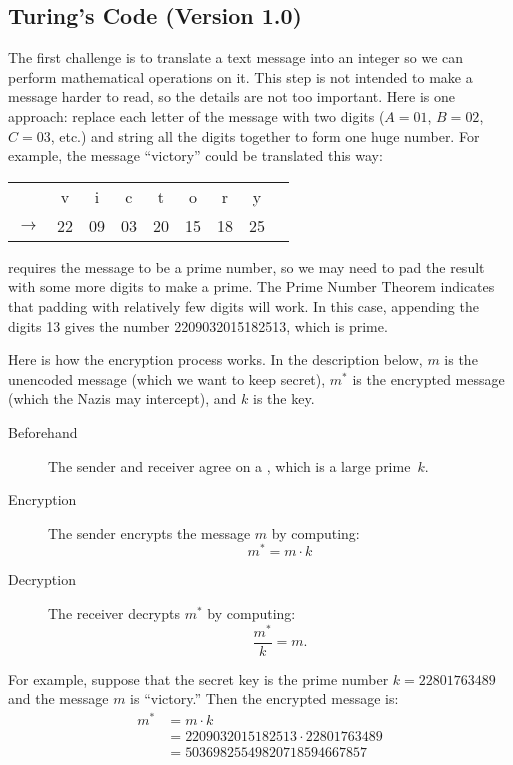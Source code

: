 \subsection{Turing's Code (Version 1.0)}

The first challenge is to translate a text message into an integer so
we can perform mathematical operations on it.  This step is not
intended to make a message harder to read, so the details are not too
important.  Here is one approach: replace each letter of the message
with two digits ($A = 01$, $B = 02$, $C = 03$, etc.) and string all
the digits together to form one huge number.  For example, the message
``victory'' could be translated this way:
\begin{center}
\begin{tabular}{ccccccccc}
   &v & i & c & t & o & r & y \\
$\rightarrow$ & 22 & 09 & 03 & 20 &
  15 & 18 & 25
\end{tabular}
\end{center}
 requires the message to be a prime number, so we
may need to pad the result with some more digits to make a prime.  The
Prime Number Theorem indicates that padding with relatively few digits
will work.  In this case, appending the digits 13 gives the number
2209032015182513, which is prime.

Here is how the encryption process works.  In the description below,
$m$ is the unencoded message (which we want to keep secret), $m^*$ is
the encrypted message (which the Nazis may intercept), and $k$ is the
key.

\begin{description}

\item[Beforehand] The sender and receiver agree on a , which is a large prime~$k$.

\item[Encryption] The sender encrypts the message $m$ by computing:
\[
m^* = m \cdot k
\]

\item[Decryption] The receiver decrypts $m^*$ by computing:
\[
\frac{m^*}{k} = m.
\]

\iffalse = \frac{m \cdot k}{k} \fi

\end{description}

For example, suppose that the secret key is the prime number $k =
22801763489$ and the message $m$ is ``victory.''  Then the encrypted
message is:
\begin{align*}
m^* & = m \cdot k \\
& = 2209032015182513 \cdot 22801763489 \\
& =
50369825549820718594667857
\end{align*}

